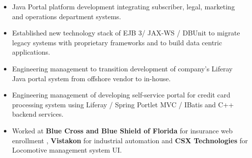 \documentclass[10pt,a4paper,ragged2e]{altacv}
\begin{document}
\divider

\begin{itemize}
\item Java Portal platform development integrating subscriber, legal, marketing and operations department systems.
\end{itemize}

\divider


\begin{itemize}
\item 
Established new technology stack of EJB 3/ JAX-WS / DBUnit to migrate legacy systems with proprietary frameworks and to build data centric applications.
\end{itemize}

\divider


\begin{itemize}
\item 
Engineering management to transition development of company’s Liferay Java portal system from offshore vendor to in-house.
\end{itemize}

\divider


\begin{itemize}
\item 
Engineering management of developing self-service portal for credit card processing system using Liferay / Spring Portlet MVC / IBatis and C++ backend services.
\end{itemize}

\divider


\begin{itemize}
\item 
Worked at \textbf{Blue Cross and Blue Shield of Florida} for insurance web enrollment , \textbf{Vistakon} for industrial automation and \textbf{CSX Technologies} for Locomotive management system UI.
\end{itemize}
\end{document}
